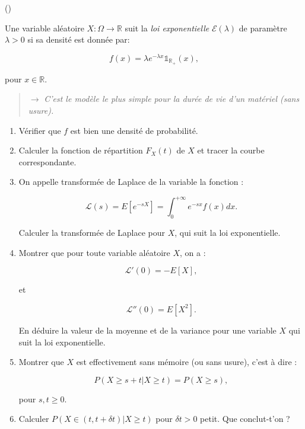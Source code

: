 \begin{exercice}\label{exo4-10} (\coolexo)

Une variable al\'eatoire $X : \Omega \rightarrow \mathbb{R}$ suit la {\it loi exponentielle} $\mathcal{E} (\lambda)$ de param\`etre $\lambda > 0$ si sa densit\'e est donn\'ee par:

\[
f(x) = \lambda e^{-\lambda x} \mathds{1}_{\mathbb{R}_+} (x),
\]


pour $x \in \mathbb{R}$. 

\begin{quotation}
$\rightarrow $ {\it C'est le mod\`ele le plus simple pour la dur\'ee de vie d'un mat\'eriel (sans usure).}
\end{quotation}

\begin{enumerate}

\item V\'erifier que $f$ est bien une densit\'e de probabilit\'e.

\item Calculer la fonction de r\'epartition $F_X (t)$ de $X$ et tracer la courbe correspondante.

\item On appelle transform\'ee de Laplace de la variable la fonction :

\[
\mathcal{L} (s) = E [ e^{-sX} ] = \int_0^{+ \infty} e^{-sx} f(x) dx.
\]

Calculer la transform\'ee de Laplace pour $X$, qui suit la loi exponentielle.

\item Montrer que pour toute variable al\'eatoire $X$, on a :

\[
\mathcal{L}' (0) = - E[X], 
\]

et

\[
\mathcal{L}'' (0) = E[X^2]. 
\]

En d\'eduire la valeur de la moyenne et de la variance pour une variable $X$ qui suit la loi
exponentielle.

\item Montrer que $X$ est effectivement sans m\'emoire (ou sans usure), c'est \`a dire :

\[
P ( X \geq s+t | X \geq t) = P ( X \geq s),
\]

pour $s,t \geq 0$.

\item Calculer $P(X \in (t , t + \delta t) | X \geq t )$ pour $\delta t > 0$ petit. Que conclut-t'on ?

\end{enumerate}


\end{exercice}
